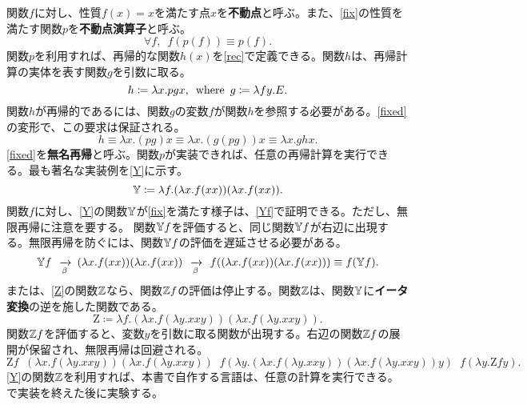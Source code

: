 \documentclass[10pt,a4paper]{book}
\DeclareMathOperator*{\app}{\enspace\xrightarrow[\beta]{}\enspace}
\begin{document}
%
関数$f$に対し、性質$f(x)\!=\!x$を満たす点$x$を\textbf{不動点}と呼ぶ。また、\eqref{fix}の性質を満たす関数$p$を\textbf{不動点演算子}と呼ぶ。
%
\begin{equation}
\label{eq:fix}
\forall f, \enspace f(p(f)) \equiv p(f).
\end{equation}
%
関数$p$を利用すれば、再帰的な関数$h(x)$を\eqref{rec}で定義できる。関数$h$は、再帰計算の実体を表す関数$g$を引数に取る。
%
\begin{equation}
\label{eq:rec}
h \coloneqq \lambda x.pgx, \enspace\mathrm{where}\enspace g \coloneqq \lambda fy.E.
\end{equation}
%
関数$h$が再帰的であるには、関数$g$の変数$f$が関数$h$を参照する必要がある。\eqref{fixed}の変形で、この要求は保証される。
%
\begin{equation}
\label{eq:fixed}
h
\equiv \lambda x.(pg) x
\equiv \lambda x.(g (pg)) x
\equiv \lambda x.ghx.
\end{equation}
%
\eqref{fixed}を\textbf{無名再帰}と呼ぶ。関数$p$が実装できれば、任意の再帰計算を実行できる。最も著名な実装例を\eqref{Y}に示す。
%
\begin{equation}
\label{eq:Y}
\mathbb{Y}{} \coloneqq \lambda f.(\lambda x.f(xx))(\lambda x.f(xx)).
\end{equation}
%
関数$f$に対し、\eqref{Y}の関数$\mathbb{Y}$が\eqref{fix}を満たす様子は、\eqref{Yf}で証明できる。ただし、無限再帰に注意を要する。
関数$\mathbb{Y}{}f$を評価すると、同じ関数$\mathbb{Y}{}f$が右辺に出現する。無限再帰を防ぐには、関数$\mathbb{Y}{}f$の評価を遅延させる必要がある。
%
\begin{equation}
\label{eq:Yf}
\Yc{}f
\app (\lambda x.f(xx))(\lambda x.f(xx))
\app f((\lambda x.f(xx))(\lambda x.f(xx)))
\equiv f(\Yc{}f).
\end{equation}
%
または、\eqref{Z}の関数$\mathbb{Z}$なら、関数$\mathbb{Z}{}f$の評価は停止する。関数$\mathbb{Z}{}$は、関数$\mathbb{Y}$に\textbf{イータ変換}の逆を施した関数である。
%
\begin{equation}
\label{eq:Z}
\mathrm{Z} \coloneqq \lambda f.(\lambda x.f(\lambda y.xxy))(\lambda x.f(\lambda y.xxy)).
\end{equation}
%
関数$\mathbb{Z}{}f$を評価すると、変数$y$を引数に取る関数が出現する。右辺の関数$\mathbb{Z}{}f$の展開が保留され、無限再帰は回避される。
%
\begin{equation}
\label{eq:Zf}
\mathrm{Z}f
\app (\lambda x.f(\lambda y.xxy))(\lambda x.f(\lambda y.xxy))
\app f(\lambda y.(\lambda x.f(\lambda y.xxy))(\lambda x.f(\lambda y.xxy))y)
\app f(\lambda y.\mathrm{Z}fy).
\end{equation}
%
\eqref{Y}の関数$\mathbb{Z}$を利用すれば、本書で自作する言語は、任意の計算を実行できる。で実装を終えた後に実験する。
\end{document}
